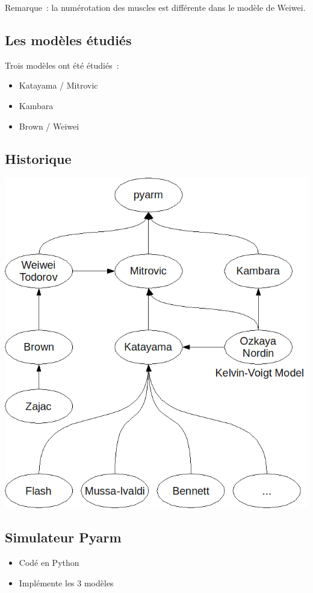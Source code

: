 \documentclass[pdftex,a4paper,11pt]{article}
\numberwithin{equation}{subsection}
\begin{document}
Remarque~: la numérotation des muscles est différente dans le modèle de Weiwei.

\subsection{Les modèles étudiés}
Trois modèles ont été étudiés~:
\begin{itemize}
    \item Katayama / Mitrovic \cite{katayama1993, ozkaya1999, mitrovic10, mitrovic2008, mitrovic2009}
    \item Kambara \cite{kambara2009, ozkaya1999}
    \item Brown / Weiwei \cite{brown1999, li2006, li2004, todorov2005}
\end{itemize}

\subsection{Historique}

\begin{center}
        \includegraphics[width=.80\linewidth]{fig/bib}
\end{center}

\subsection{Simulateur Pyarm}

\begin{itemize}
    \item Codé en Python
    \item Implémente les 3 modèles
\end{itemize}
\end{document}
